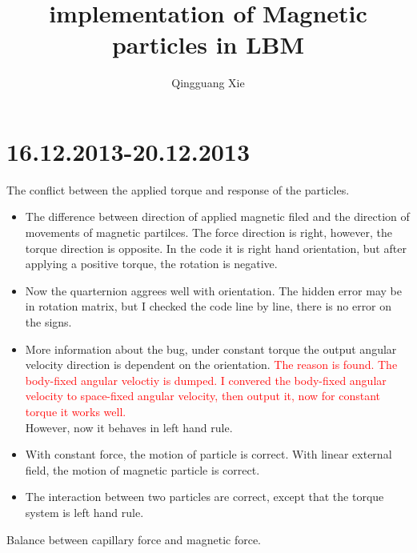 \documentclass[a4paper,10pt]{article}
\title{implementation of Magnetic particles in LBM}
\author{Qingguang Xie}
\begin{document}
\maketitle

\begin{abstract}

\end{abstract}
\newpage

\section{16.12.2013-20.12.2013}
The conflict between the applied torque and response of the particles.
\begin{itemize}
 \item The difference between direction of applied magnetic filed and the direction of movements of magnetic partilces.
       The force direction is right, however, the torque direction is opposite.
       In the code it is right hand orientation, but after applying a positive torque, the rotation is negative.
  \item Now the quarternion aggrees well with orientation. 
        The hidden error may be in rotation matrix, but I checked the code line by line, there is no error on the signs.
   \item  More information about the bug, under constant torque the output angular velocity direction is dependent on the orientation.
          \textcolor{red}{The reason is found. The body-fixed angular veloctiy is dumped. 
          I convered the body-fixed angular velocity to space-fixed angular velocity, then output 
          it, now for constant torque it works well.}\\
          However, now it behaves in left hand rule.
   \item  With constant force, the motion of particle is correct. With linear external field, the motion of magnetic particle is correct. 
    \item The interaction between two particles are correct, except that the torque system is left hand rule.
\textcolor{red}{}
\end{itemize}
Balance between capillary force and magnetic force.~\cite{Lumay2013}
\end{document}
